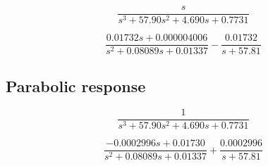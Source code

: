 \begin{equation}
\frac{s}{s^3 +57.90 s^2 + 4.690 s +0.7731}
\end{equation}

\begin{equation}
\frac{0.01732 s + 0.000004006}{s^2 +0.08089 s +0.01337} - \frac{0.01732}{s + 57.81}
\end{equation}

\subsection{Parabolic response}

\begin{equation}
\frac{1}{s^3 +57.90 s^2 + 4.690 s +0.7731}
\end{equation}

\begin{equation}
\frac{-0.0002996 s + 0.01730}{s^2 + 0.08089 s + 0.01337}+\frac{0.0002996}{s+ 57.81}
\end{equation}


